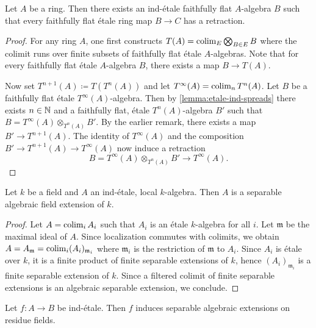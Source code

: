 \begin{proposition}
    Let $A$ be a ring. Then there exists an ind-étale faithfully flat $A$-algebra $B$ such that
    every faithfully flat étale ring map $B \to C$ has a retraction.
    \label{prop:exists-ind-etale-retraction-etale}
\end{proposition}

\begin{proof}
    For any ring $A$, one first constructs $T(A) = \operatorname{colim}_{E} \bigotimes_{B \in E} B$ where
    the colimit runs over finite subsets of faithfully flat étale $A$-algebras. Note that for every faithfully flat étale
    $A$-algebra $B$, there exists a map $B \to T(A)$.

    Now set $T^{n+1}(A) \coloneqq T(T^n(A))$
    and let $T^{\infty}(A) = \operatorname{colim}_n T^n(A)$. Let $B$ be a faithfully flat étale $T^{\infty}(A)$-algebra. Then
    by \ref{lemma:etale-ind-spreads}
    there exists $n \in \mathbb{N}$ and a faithfully flat, étale $T^n(A)$-algebra $B'$ such that
    $B = T^{\infty}(A) \otimes_{T^n(A)} B'$. By the earlier remark, there exists a map
    $B' \to T^{n+1}(A)$. The identity of $T^{\infty}(A)$ and the composition
    $B' \to T^{n+1}(A) \to T^{\infty}(A)$ now induce a retraction
    \[
    B = T^{\infty}(A) \otimes_{T^n(A)} B' \to T^{\infty}(A)
    .\]
\end{proof}

\begin{lemma}
    Let $k$ be a field and $A$ an ind-étale, local $k$-algebra. Then $A$ is
    a separable algebraic field extension of $k$.
    \label{lemma:field-local-indetale}
\end{lemma}

\begin{proof}
    Let $A = \operatorname{colim}_i A_i$ such that $A_i$ is an étale $k$-algebra for all $i$.
    Let $\mathfrak{m}$ be the maximal ideal of $A$. Since localization commutes with colimits,
    we obtain $A = A_{\mathfrak{m}} = \operatorname{colim}_i (A_i)_{\mathfrak{m}_i}$ where
    $\mathfrak{m}_i$ is the restriction of $\mathfrak{m}$ to $A_i$. Since $A_i$ is étale over $k$,
    it is a finite product of finite separable extensions of $k$, hence $(A_i)_{\mathfrak{m}_i}$
    is a finite separable extension of $k$. Since a filtered colimit of finite separable
    extensions is an algebraic separable extension, we conclude.
\end{proof}

\begin{proposition}
    Let $f\colon A \to B$ be ind-étale. Then $f$ induces separable algebraic extensions on residue fields.
    \label{prop:ind-etale-residue-fields}
\end{proposition}

